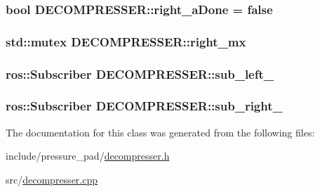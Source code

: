\hypertarget{class_d_e_c_o_m_p_r_e_s_s_e_r_a6ebe4ab2dc19da34d1c2124dd3d3932e}{
\subsubsection[{right\-\_\-a\-Done}]{\setlength{\rightskip}{0pt plus 5cm}bool D\-E\-C\-O\-M\-P\-R\-E\-S\-S\-E\-R\-::right\-\_\-a\-Done = false\hspace{0.3cm}{\ttfamily [private]}}}\label{class_d_e_c_o_m_p_r_e_s_s_e_r_a6ebe4ab2dc19da34d1c2124dd3d3932e}
\hypertarget{class_d_e_c_o_m_p_r_e_s_s_e_r_a460f81e181d9cf6bd3e231ccb214ee85}{
\subsubsection[{right\-\_\-mx}]{\setlength{\rightskip}{0pt plus 5cm}std\-::mutex D\-E\-C\-O\-M\-P\-R\-E\-S\-S\-E\-R\-::right\-\_\-mx\hspace{0.3cm}{\ttfamily [private]}}}\label{class_d_e_c_o_m_p_r_e_s_s_e_r_a460f81e181d9cf6bd3e231ccb214ee85}
\hypertarget{class_d_e_c_o_m_p_r_e_s_s_e_r_a8e49925bbb0afc939e26af6d72d8af02}{
\subsubsection[{sub\-\_\-left\-\_\-}]{\setlength{\rightskip}{0pt plus 5cm}ros\-::\-Subscriber D\-E\-C\-O\-M\-P\-R\-E\-S\-S\-E\-R\-::sub\-\_\-left\-\_\-\hspace{0.3cm}{\ttfamily [private]}}}\label{class_d_e_c_o_m_p_r_e_s_s_e_r_a8e49925bbb0afc939e26af6d72d8af02}
\hypertarget{class_d_e_c_o_m_p_r_e_s_s_e_r_a09941b5967e1aa1bb182ad155bc5fb46}{
\subsubsection[{sub\-\_\-right\-\_\-}]{\setlength{\rightskip}{0pt plus 5cm}ros\-::\-Subscriber D\-E\-C\-O\-M\-P\-R\-E\-S\-S\-E\-R\-::sub\-\_\-right\-\_\-\hspace{0.3cm}{\ttfamily [private]}}}\label{class_d_e_c_o_m_p_r_e_s_s_e_r_a09941b5967e1aa1bb182ad155bc5fb46}


The documentation for this class was generated from the following files\-:\begin{DoxyCompactItemize}
\item 
include/pressure\-\_\-pad/\hyperlink{decompresser_8h}{decompresser.\-h}\item 
src/\hyperlink{decompresser_8cpp}{decompresser.\-cpp}\end{DoxyCompactItemize}
